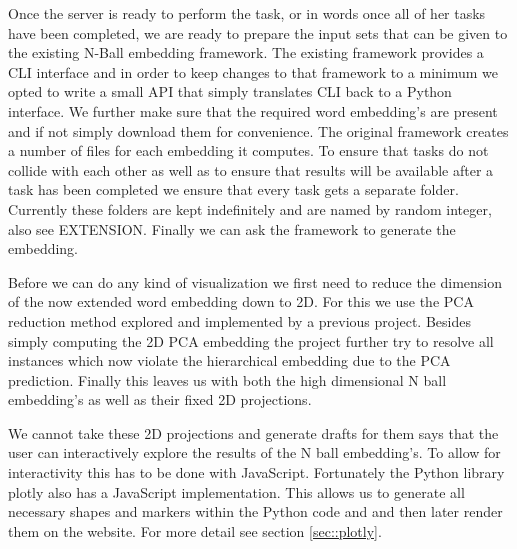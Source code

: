 \documentclass[]{article}
\begin{document}
Once the server is ready to perform the task, or in words once all of her tasks have been completed, we are ready to prepare the input sets that can be given to the existing N-Ball embedding framework. The existing framework provides a CLI interface and in order to keep changes to that framework to a minimum we opted to write a small API that simply translates CLI back to a Python interface. We further make sure that the required word embedding's are present and if not simply download them for convenience. The original framework creates a number of files for each embedding it computes. To ensure that tasks do not collide with each other as well as to ensure that results will be available after a task has been completed we ensure that every task gets a separate folder. Currently these folders are kept indefinitely and are named by random integer, also see EXTENSION. Finally we can ask the framework to generate the embedding.

Before we can do any kind of visualization we first need to reduce the dimension of the now extended word embedding down to 2D. For this we use the PCA reduction method explored and implemented by a previous project. Besides simply computing the 2D PCA embedding the project further try to resolve all instances which now violate the hierarchical embedding due to the PCA prediction. Finally this leaves us with both the high dimensional N ball embedding's as well as their fixed 2D projections.

We cannot take these 2D projections and generate drafts for them says that the user can interactively explore the results of the N ball embedding's. To allow for interactivity this has to be done with JavaScript. Fortunately the Python library plotly also has a JavaScript implementation. This allows us to generate all necessary shapes and markers within the Python code and and then later render them on the website. For more detail see section \ref{sec::plotly}.
\end{document}
